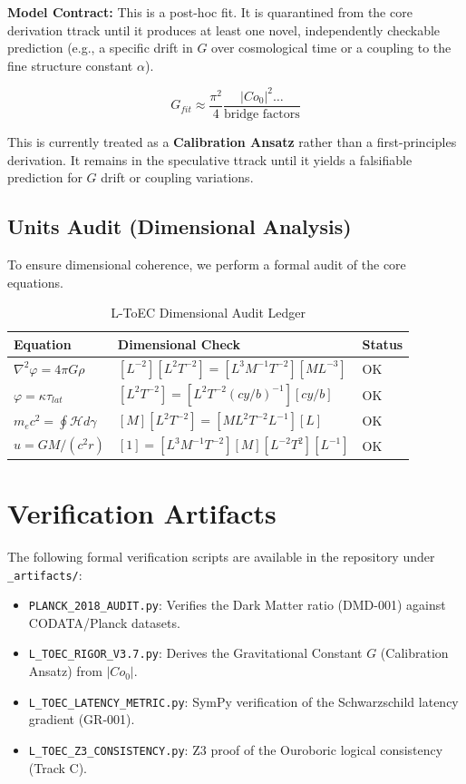 \documentclass[11pt,titlepage]{article}
\begin{document}
\textbf{Model Contract:} This is a post-hoc fit. It is quarantined from the core derivation ttrack until it produces at least one novel, independently checkable prediction (e.g., a specific drift in $G$ over cosmological time or a coupling to the fine structure constant $\alpha$).

\begin{equation}
G_{fit} \approx \frac{\pi^2}{4} \frac{|Co_0|^2 \dots}{\text{bridge factors}}
\end{equation}

This is currently treated as a \textbf{Calibration Ansatz} rather than a first-principles derivation. It remains in the speculative ttrack until it yields a falsifiable prediction for $G$ drift or coupling variations.

\subsection{Units Audit (Dimensional Analysis)}
\label{sec:units_audit}
To ensure dimensional coherence, we perform a formal audit of the core equations.

\begin{table}[h!]
\centering
\begin{tabular}{@{}lll@{}}
\toprule
\textbf{Equation} & \textbf{Dimensional Check} & \textbf{Status} \\ \midrule
$\nabla^2 \varphi = 4\pi G \rho$ & $[L^{-2}][L^2 T^{-2}] = [L^3 M^{-1} T^{-2}][M L^{-3}]$ & OK \\
$\varphi = \kappa \tau_{lat}$ & $[L^2 T^{-2}] = [L^2 T^{-2} (cy/b)^{-1}][cy/b]$ & OK \\
$m_e c^2 = \oint \mathcal{H} d\gamma$ & $[M][L^2 T^{-2}] = [M L^2 T^{-2} L^{-1}][L]$ & OK \\
$u = GM/(c^2 r)$ & $[1] = [L^3 M^{-1} T^{-2}][M][L^{-2} T^2][L^{-1}]$ & OK \\ \bottomrule
\end{tabular}
\caption{L-ToEC Dimensional Audit Ledger}
\end{table}

\section{Verification Artifacts}
The following formal verification scripts are available in the repository under \texttt{\_artifacts/}:
\begin{itemize}
    
\item \texttt{PLANCK\_2018\_AUDIT.py}: Verifies the Dark Matter ratio (DMD-001) against CODATA/Planck datasets.
    
\item \texttt{L\_TOEC\_RIGOR\_V3.7.py}: Derives the Gravitational Constant $G$ (Calibration Ansatz) from $|Co_0|$.
    
\item \texttt{L\_TOEC\_LATENCY\_METRIC.py}: SymPy verification of the Schwarzschild latency gradient (GR-001).
    
\item \texttt{L\_TOEC\_Z3\_CONSISTENCY.py}: Z3 proof of the Ouroboric logical consistency (Track C).
\end{itemize}
\end{document}
